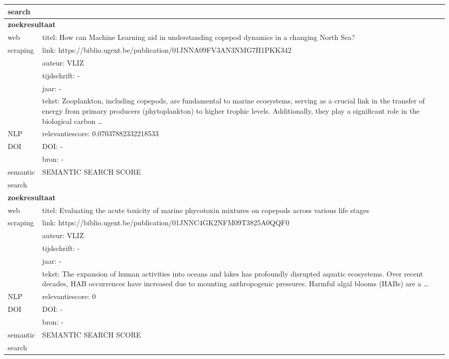 \begin{table}[h!]
\begin{tabularx}{\textwidth}{|p{4cm}|X|}
        search&\\
        \hline
        \multicolumn{2}{|X|}{\textbf{zoekresultaat}} \\
        \hline
        web &titel: How can Machine Learning aid in understanding copepod dynamics in a changing North Sea?\\
        scraping&link: https://biblio.ugent.be/publication/01JNNA09FV3AN3NMG7H1PKK342\\
        &auteur: VLIZ\\
        &tijdschrift: -\\
        &jaar: -\\
        &tekst: Zooplankton, including copepods, are fundamental to marine ecosystems, serving as a crucial link in the transfer of energy from primary producers (phytoplankton) to higher trophic levels. Additionally, they play a significant role in the biological carbon …\\
        \hline
        NLP&relevantiescore: 0.07037882332218533\\
        \hline
        DOI&DOI: -\\
        &bron: -\\
        \hline
        semantic&SEMANTIC SEARCH SCORE\\
        search&\\
        \hline
        \multicolumn{2}{|X|}{\textbf{zoekresultaat}} \\
        \hline
        web &titel: Evaluating the acute toxicity of marine phycotoxin mixtures on copepods across various life stages\\
        scraping&link: https://biblio.ugent.be/publication/01JNNC4GK2NFM09T3825A0QQF0\\
        &auteur: VLIZ\\
        &tijdschrift: -\\
        &jaar: -\\
        &tekst: The expansion of human activities into oceans and lakes has profoundly disrupted aquatic ecosystems. Over recent decades, HAB occurrences have increased due to mounting anthropogenic pressures. Harmful algal blooms (HABs) are a …\\
        \hline
        NLP&relevantiescore: 0\\
        \hline
        DOI&DOI: -\\
        &bron: -\\
        \hline
        semantic&SEMANTIC SEARCH SCORE\\
        search&\\

\end{tabularx}
\end{table}
